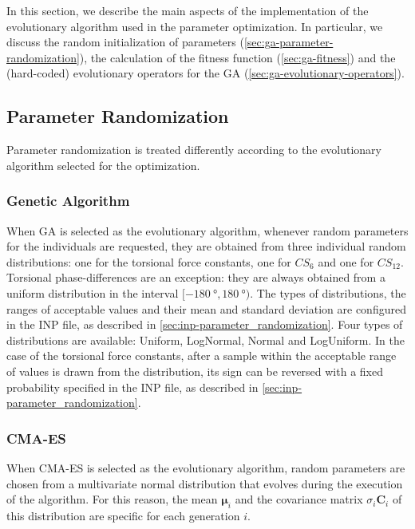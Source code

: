 \documentclass[10pt,a4paper,openany]{memoir}
\numberwithin{equation}{section}
\begin{document}
In this section, we describe the main aspects of the implementation of
the evolutionary algorithm used in the parameter optimization.  In
particular, we discuss the random initialization of parameters
(\autoref{sec:ga-parameter-randomization}), the calculation of the
fitness function (\autoref{sec:ga-fitness}) and the (hard-coded)
evolutionary operators for the GA
(\autoref{sec:ga-evolutionary-operators}).

\subsection{Parameter Randomization}
\label{sec:ga-parameter-randomization}

Parameter randomization is treated differently according to the
evolutionary algorithm selected for the optimization.

\subsubsection{Genetic Algorithm}

When GA is selected as the evolutionary algorithm, whenever random
parameters for the individuals are requested, they are obtained from
three individual random distributions: one for the torsional force
constants, one for $CS_6$ and one for $CS_{12}$.  Torsional
phase-differences are an exception: they are always obtained from a
uniform distribution in the interval
$[\SI{-180}{\degree}, \SI{180}{\degree})$.  The types of
distributions, the ranges of acceptable values and their mean and
standard deviation are configured in the INP file, as described in
\autoref{sec:inp-parameter_randomization}.  Four types of
distributions are available: Uniform, LogNormal, Normal and
LogUniform. In the case of the torsional force constants, after a sample
within the acceptable range of values is drawn from the distribution,
its sign can be reversed with a fixed probability specified in the INP
file, as described in \autoref{sec:inp-parameter_randomization}.

\subsubsection{CMA-ES}

When CMA-ES is selected as the evolutionary algorithm, random
parameters are chosen from a multivariate normal distribution that
evolves during the execution of the algorithm. For this reason, the
mean $\boldsymbol{\mu}_i$ and the covariance matrix
$\sigma_i \boldsymbol{C}_i$ of this distribution are specific for each
generation $i$.
\end{document}
